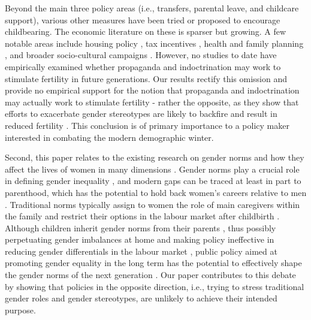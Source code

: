 \documentclass[a4paper,oneside,final,onecolumn,11pt,english]{article}
\begin{document}
Beyond the main three policy areas (i.e., transfers, parental leave, and childcare support), various other measures have been tried or proposed to encourage childbearing. The economic literature on these is sparser but growing. A few notable areas include housing policy \citep{clark2012women, fazio2024housing}, tax incentives \citep{parent2007tax, cohen2013financial, laroque2014identifying}, health and family planning \citep{abramowitz2018planning, gartner2022impacts}, and broader socio-cultural campaigns \citep{zeng2016effects, lin2024effect}. However, no studies to date have empirically examined whether propaganda and indoctrination may work to stimulate fertility in future generations. Our results rectify this omission and provide no empirical support for the notion that propaganda and indoctrination may actually work to stimulate fertility - rather the opposite, as they show that efforts to exacerbate gender stereotypes are likely to backfire and result in reduced fertility \citep{botev2015could}. This conclusion is of primary importance to a policy maker interested in combating the modern demographic winter.

Second, this paper relates to the existing research on gender norms and how they affect the lives of women in many dimensions \citep{bertrand2015gender, fortin2015gender, gousse2017marriage, andresen2019causes, grewenig2020gender, olivetti2020mothers, cortes2023children, boelmann2025wind}. Gender norms play a crucial role in defining gender inequality \citep{kleven2019child, bertrand2020gender, ashraf2022gender, bursztyn2023gender, farre2023changing}, and modern gaps can be traced at least in part to parenthood, which has the potential to hold back women’s careers relative to men \citep{daniel2013motherhood, angelov2016parenthood, kleven2019children, bertrand2020gender, cortes2023children}. Traditional norms typically assign to women the role of main caregivers within the family and restrict their options in the labour market after childbirth \citep{bertrand2015gender, fortin2015gender, gousse2017marriage, andresen2019causes, grewenig2020gender, olivetti2020mothers, cortes2023children, boelmann2025wind}. Although children inherit gender norms from their parents \citep{fernandez2004mothers, alesina2013origins, farre2013intergenerational}, thus possibly perpetuating gender imbalances at home and making policy ineffective in reducing gender differentials in the labour market \citep{albanesi2023families, kleven2024family}, public policy aimed at promoting gender equality in the long term has the potential to effectively shape the gender norms of the next generation \citep{hara2021long, farre2023changing}. Our paper contributes to this debate by showing that policies in the opposite direction, i.e., trying to stress traditional gender roles and gender stereotypes, are unlikely to achieve their intended purpose. 
\end{document}
